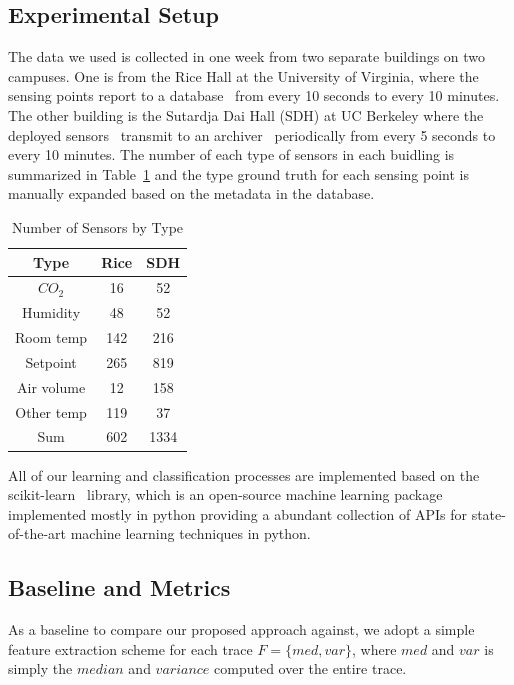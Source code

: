 \subsection{Experimental Setup}
The data we used is collected in one week from two separate buildings on two campuses. One is from the Rice Hall at the University of Virginia, where 
the sensing points report to a database~\cite{trane} from every 10 seconds to every 10 minutes. The other building is the Sutardja Dai Hall (SDH) at UC Berkeley 
where the deployed sensors~\cite{keti, bacnet} transmit to an archiver~\cite{smap} periodically from every 5 seconds to every 10 minutes. The number of each type 
of sensors in each buidling is summarized in Table~\ref{table:num} and the type ground truth for each sensing point is manually expanded based on the metadata in the database.

\begin{table}[ht!]
\centering %
\begin{tabular}{c c c}%
\hline %
Type & Rice & SDH \\ %
\hline\hline %
$CO_{2}$ & 16 & 52 \\ %
Humidity & 48 & 52 \\
Room temp & 142 & 216 \\
Setpoint & 265 & 819 \\
Air volume & 12 & 158 \\ 
Other temp & 119 & 37 \\ \hline
Sum & 602 & 1334 \\ \hline
\end{tabular}
\caption{Number of Sensors by Type}
\label{table:num} %
\end{table}

All of our learning and classification processes are implemented based on the scikit-learn~\cite{scikit} library, which is an open-source machine learning package 
implemented mostly in python providing a abundant collection of APIs for state-of-the-art machine learning techniques in python.

\subsection{Baseline and Metrics}
As a baseline to compare our proposed approach against, we adopt a simple feature extraction scheme for each trace $F=\{med, var\}$, where $med$ and $var$ is simply 
the $median$ and $variance$ computed over the entire trace.

